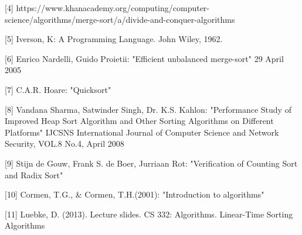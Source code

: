 \documentclass{article}
\begin{document}
[4] https://www.khanacademy.org/computing/computer-science/algorithms/merge-sort/a/divide-and-conquer-algorithms


[5] Iverson, K: A Programming Language. John Wiley, 1962.


[6] Enrico Nardelli, Guido Proietii: "Efficient unbalanced merge-sort" 29 April 2005


[7] C.A.R. Hoare: "Quicksort"


[8] Vandana Sharma, Satwinder Singh, Dr. K.S. Kahlon: "Performance Study of Improved Heap Sort Algorithm and
Other Sorting Algorithms on Different Platforms" IJCSNS International Journal of Computer Science and Network Security, VOL.8 No.4, April 2008


[9] Stijn de Gouw, Frank S. de Boer, Jurriaan Rot: "Verification of Counting Sort and Radix Sort"

[10] Cormen, T.G., \& Cormen, T.H.(2001): "Introduction to algorithms"

[11] Luebke, D. (2013). Lecture slides. CS 332: Algorithms. Linear-Time Sorting Algorithms
\end{document}
